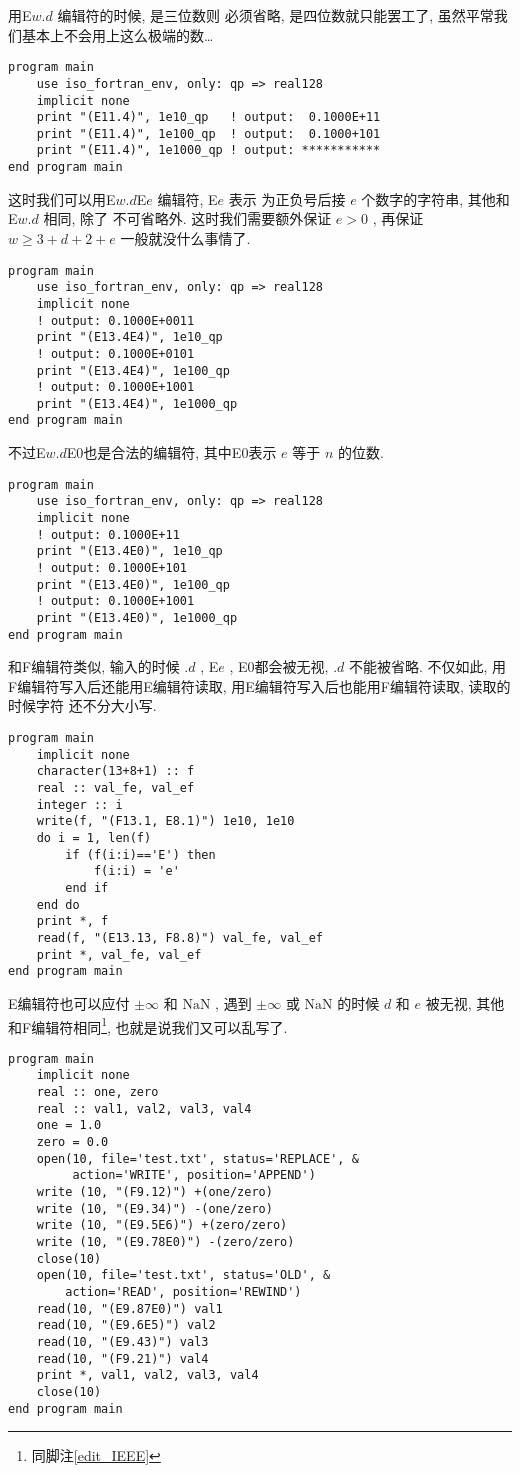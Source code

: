 用E$ w. d $ 编辑符的时候,  是三位数则  必须省略,  是四位数就只能罢工了, 虽然平常我们基本上不会用上这么极端的数\dots{}
\begin{lstlisting}
program main
    use iso_fortran_env, only: qp => real128
    implicit none
    print "(E11.4)", 1e10_qp   ! output:  0.1000E+11
    print "(E11.4)", 1e100_qp  ! output:  0.1000+101
    print "(E11.4)", 1e1000_qp ! output: ***********
end program main
\end{lstlisting}
这时我们可以用E$ w. d $E$ e $ 编辑符, E$ e $ 表示  为正负号后接 $ e $ 个数字的字符串, 其他和E$ w. d $ 相同, 除了  不可省略外. 这时我们需要额外保证 $ e>0 $ , 再保证 $ w\geqslant 3+d+2+e $ 一般就没什么事情了. 
\begin{lstlisting}
program main
    use iso_fortran_env, only: qp => real128
    implicit none
    ! output: 0.1000E+0011
    print "(E13.4E4)", 1e10_qp
    ! output: 0.1000E+0101
    print "(E13.4E4)", 1e100_qp
    ! output: 0.1000E+1001
    print "(E13.4E4)", 1e1000_qp
end program main
\end{lstlisting}
不过E$ w. d $E0也是合法的编辑符, 其中E0表示 $ e $ 等于 $ n $ 的位数.
\begin{lstlisting}
program main
    use iso_fortran_env, only: qp => real128
    implicit none
    ! output: 0.1000E+11
    print "(E13.4E0)", 1e10_qp
    ! output: 0.1000E+101
    print "(E13.4E0)", 1e100_qp
    ! output: 0.1000E+1001
    print "(E13.4E0)", 1e1000_qp
end program main
\end{lstlisting}

和F编辑符类似, 输入的时候 $. d $ , E$e $ , E0都会被无视, $. d$ 不能被省略. 不仅如此, 用F编辑符写入后还能用E编辑符读取, 用E编辑符写入后也能用F编辑符读取, 读取的时候字符  还不分大小写. 
\begin{lstlisting}
program main
    implicit none
    character(13+8+1) :: f
    real :: val_fe, val_ef
    integer :: i
    write(f, "(F13.1, E8.1)") 1e10, 1e10
    do i = 1, len(f)
        if (f(i:i)=='E') then
            f(i:i) = 'e'
        end if
    end do
    print *, f
    read(f, "(E13.13, F8.8)") val_fe, val_ef
    print *, val_fe, val_ef
end program main
\end{lstlisting}

E编辑符也可以应付 $ \pm\infty $ 和 $ \text{NaN} $ , 遇到 $ \pm\infty $ 或 $ \text{NaN} $ 的时候 $ d $ 和 $ e $ 被无视, 其他和F编辑符相同\footnote{同脚注\ref{edit_IEEE}}, 也就是说我们又可以乱写了. 
\begin{lstlisting}
program main
    implicit none
    real :: one, zero
    real :: val1, val2, val3, val4
    one = 1.0
    zero = 0.0
    open(10, file='test.txt', status='REPLACE', &
         action='WRITE', position='APPEND')
    write (10, "(F9.12)") +(one/zero)
    write (10, "(E9.34)") -(one/zero)
    write (10, "(E9.5E6)") +(zero/zero)
    write (10, "(E9.78E0)") -(zero/zero)
    close(10)
    open(10, file='test.txt', status='OLD', &
        action='READ', position='REWIND')
    read(10, "(E9.87E0)") val1
    read(10, "(E9.6E5)") val2
    read(10, "(E9.43)") val3
    read(10, "(F9.21)") val4
    print *, val1, val2, val3, val4
    close(10)
end program main
\end{lstlisting}

